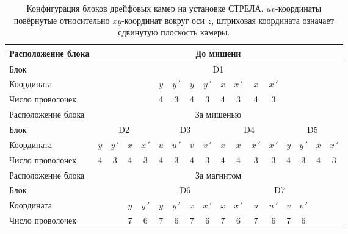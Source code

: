 \begin{table}[h]
  \begin{center}
    \bigskip
    \resizebox{1.0\textwidth}{!} {
      \begin{tabular}{|l|c|c|c|c|c|c|c|c|c|c|c|c|c|c|c|c|}
        \hline
        Расположение блока & \multicolumn{16}{c|}{До мишени} \\
        \hline
        Блок & \multicolumn{4}{c|}{} &
        \multicolumn{8}{M|}{D1} & \multicolumn{4}{c|}{} \\
        \cline{6-13}
        Координата & \multicolumn{4}{c|}{} &
        $y$ & $y\,'$ & $y$ & $y\,'$ & $x$ & $x\,'$ & $x$ & $x\,'$ &
        \multicolumn{4}{c|}{} \\
        Число проволочек & \multicolumn{4}{c|}{} &
        4 & 3 & 4 & 3 & 4 & 3 & 4 & 3 & \multicolumn{4}{c|}{} \\
        \hline \hline

        Расположение блока & \multicolumn{16}{c|}{За мишенью} \\
        \hline
        Блок & \multicolumn{4}{M|}{D2} & \multicolumn{4}{M|}{D3} &
        \multicolumn{4}{M|}{D4} & \multicolumn{4}{M|}{D5} \\
        \cline{2-17}
        Координата & $y$ & $y\,'$ & $x$ & $x\,'$ & $u$ & $u\,'$ & $v$ & $v\,'$ &
        $x$ & $x$ & $x\,'$ & $x\,'$ & $y$ & $y\,'$ & $x$ & $x\,'$ \\
        Число проволочек &
        4 & 3 & 4 & 3 & 4 & 3 & 4 & 3 & 4 & 4 & 3 & 3 & 4 & 3 & 4 & 3 \\
        \hline \hline

        Расположение блока & \multicolumn{16}{c|}{За магнитом} \\
        \hline
        Блок & \multicolumn{2}{c|}{} & \multicolumn{8}{M|}{D6} &
        \multicolumn{4}{M|}{D7} & \multicolumn{2}{c|}{} \\
        \cline{4-15}
        Координата & \multicolumn{2}{c|}{} &
        $y$ & $y\,'$ & $y$ & $y\,'$ & $x$ & $x\,'$ & $x$ & $x\,'$ & $u$ & $u\,'$
        & $v$ & $v\,'$ &
        \multicolumn{2}{c|}{} \\
        Число проволочек & \multicolumn{2}{c|}{} &
        7 & 6 & 7 & 6 & 7 & 6 & 7 & 6 & 7 & 6 & 7 & 6 & \multicolumn{2}{c|}{} \\
        \hline
      \end{tabular}
    }
    \smallskip
    \caption{Конфигурация блоков дрейфовых камер на установке
      СТРЕЛА. $uv$-координаты повёрнутые относительно $xy$-координат вокруг оси
      $z$, штриховая координата означает сдвинутую плоскость камеры.}
    \label{tab:cham_config}
  \end{center}
\end{table}



